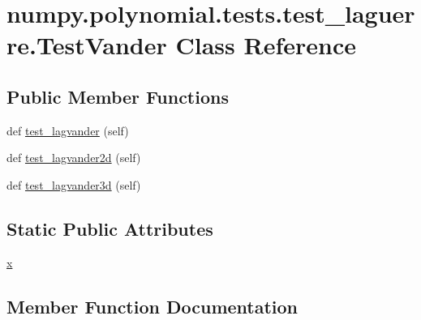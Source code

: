 \hypertarget{classnumpy_1_1polynomial_1_1tests_1_1test__laguerre_1_1TestVander}{}\section{numpy.\+polynomial.\+tests.\+test\+\_\+laguerre.\+Test\+Vander Class Reference}
\label{classnumpy_1_1polynomial_1_1tests_1_1test__laguerre_1_1TestVander}
\subsection*{Public Member Functions}
\begin{DoxyCompactItemize}
\item 
def \hyperlink{classnumpy_1_1polynomial_1_1tests_1_1test__laguerre_1_1TestVander_aea25d7969150dfd7db3e0b27162f3cd4}{test\+\_\+lagvander} (self)
\item 
def \hyperlink{classnumpy_1_1polynomial_1_1tests_1_1test__laguerre_1_1TestVander_a170b407c699250a0a98a77f2fdf97400}{test\+\_\+lagvander2d} (self)
\item 
def \hyperlink{classnumpy_1_1polynomial_1_1tests_1_1test__laguerre_1_1TestVander_adc865108e32772e7665cad8d3fa84523}{test\+\_\+lagvander3d} (self)
\end{DoxyCompactItemize}
\subsection*{Static Public Attributes}
\begin{DoxyCompactItemize}
\item 
\hyperlink{classnumpy_1_1polynomial_1_1tests_1_1test__laguerre_1_1TestVander_a74f698bbff77c6395964f6b1aa8bb70b}{x}
\end{DoxyCompactItemize}


\subsection{Member Function Documentation}
\mbox{\label{classnumpy_1_1polynomial_1_1tests_1_1test__laguerre_1_1TestVander_aea25d7969150dfd7db3e0b27162f3cd4}} 
